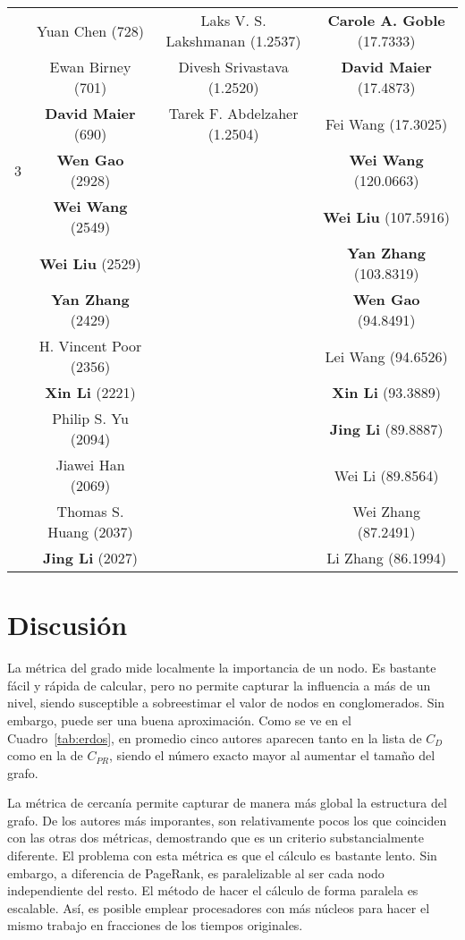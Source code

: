 \documentclass[journal]{IEEEtran}
\begin{document}
\begin{table*}
\begin{tabular}{c|c|c|c}
		  & Yuan Chen (728)& Laks V. S. Lakshmanan (1.2537)& \textbf{Carole A. Goble} (17.7333)\\
		  & Ewan Birney (701)& Divesh Srivastava (1.2520)& \textbf{David Maier} (17.4873)\\
		  & \textbf{David Maier} (690)& Tarek F. Abdelzaher (1.2504)& Fei Wang (17.3025)\\
		\hline
		3 & \textbf{Wen Gao} (2928)& & \textbf{Wei Wang} (120.0663)\\
		  &	\textbf{Wei Wang} (2549)& & \textbf{Wei Liu} (107.5916)\\
		  &	\textbf{Wei Liu} (2529)& & \textbf{Yan Zhang} (103.8319)\\
		  & \textbf{Yan Zhang} (2429)& & \textbf{Wen Gao} (94.8491)\\
		  &	H. Vincent Poor (2356)& & Lei Wang (94.6526)\\
		  & \textbf{Xin Li} (2221)& & \textbf{Xin Li} (93.3889)\\
		  & Philip S. Yu (2094)& & \textbf{Jing Li} (89.8887)\\
		  & Jiawei Han (2069)& & Wei Li (89.8564)\\
		  & Thomas S. Huang (2037)& & Wei Zhang (87.2491)\\
		  &	\textbf{Jing Li} (2027)& & Li Zhang (86.1994)\\
		  
		\hline
	\end{tabular}
\end{table*}
\section{Discusión}
La métrica del grado mide localmente la importancia de un nodo. Es bastante fácil y rápida de calcular, pero no permite capturar la influencia a más de un nivel, siendo susceptible a sobreestimar el valor de nodos en conglomerados. Sin embargo, puede ser una buena aproximación. Como se ve en el Cuadro~\ref{tab:erdos}, en promedio cinco autores aparecen tanto en la lista de \(C_D\) como en la de \(C_{PR}\), siendo el número exacto mayor al aumentar el tamaño del grafo.

La métrica de cercanía permite capturar de manera más global la estructura del grafo. De los autores más imporantes, son relativamente pocos los que coinciden con las otras dos métricas, demostrando que es un criterio substancialmente diferente. El problema con esta métrica es que el cálculo es bastante lento. Sin embargo, a diferencia de PageRank, es paralelizable al ser cada nodo independiente del resto. El método de hacer el cálculo de forma paralela es escalable. Así, es posible emplear procesadores con más núcleos para hacer el mismo trabajo en fracciones de los tiempos originales.
\end{document}

